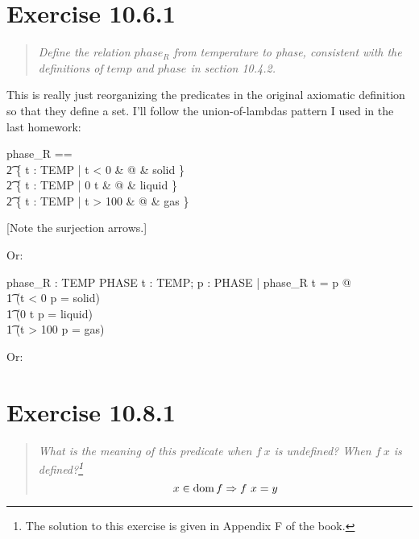 \documentclass[10pt]{article}
\begin{document}
\section{Exercise 10.6.1}
\begin{quote}
  {\it Define the relation $phase_R$ from temperature to phase, consistent with the definitions of
    $temp$ and $phase$ in section 10.4.2.  }
\end{quote}

This is really just reorganizing the predicates in the original axiomatic definition so that they
define a set.  I'll follow the union-of-lambdas pattern I used in the last homework:

\begin{syntax}
  phase_R ==                                                         \\
  \t2 \{ \lambda t : TEMP | t < 0             & @ & solid \} \union  \\
  \t2 \{ \lambda t : TEMP | 0 \leq t  & @ & liquid \} \union \\
  \t2 \{ \lambda t : TEMP | t > 100           & @ & gas \}
\end{syntax}

{\color{orange}
  [Note the surjection arrows.]

  Or:
  \begin{axdef}
    phase_R : TEMP \surj PHASE
    \where
    \forall t : TEMP; p : PHASE | phase_R t = p @ \\
    \t1 (t < 0 \land p = solid) \lor \\
    \t1 (0 \leq t  \land p = liquid) \lor \\
    \t1 (t > 100 \land p = gas)
  \end{axdef}

  Or:

}


\section{Exercise 10.8.1}
\begin{quote}
  {\it What is the meaning of this predicate when $f\ x$ is undefined?  When $f\ x$ is
    defined?\footnote{The solution to this exercise is given in Appendix F of the book.} }
  \[ x \in \mathop{\mathrm{dom}} f \Rightarrow f\ x = y \]
\end{quote}
\end{document}
